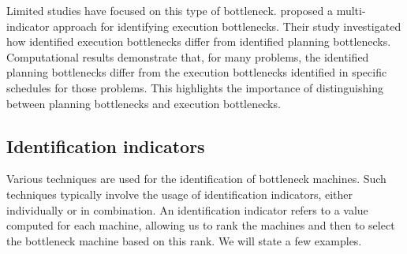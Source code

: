 Limited studies have focused on this type of bottleneck.
\citet{Wang2016} proposed a multi-indicator approach for identifying execution bottlenecks.
Their study investigated how identified execution bottlenecks differ from identified planning bottlenecks.
Computational results demonstrate that, for many problems,
the identified planning bottlenecks differ from the execution bottlenecks identified in specific schedules for those problems.
This highlights the importance of distinguishing between planning bottlenecks and execution bottlenecks.

\subsection{Identification indicators} \label{subsec:related-works/bottlenecks-in-scheduling/identification-indicators}

Various techniques are used for the identification of bottleneck machines.
Such techniques typically involve the usage of identification indicators,
either individually or in combination.
An identification indicator refers to a value computed for each machine,
allowing us to rank the machines and then to select the bottleneck machine based on this rank.
We will state a few examples.

